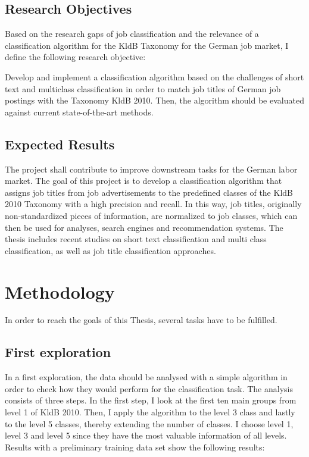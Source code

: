 \documentclass[a4paper]{article}
\begin{document}
\subsection{Research Objectives}
Based on the research gaps of job classification and the relevance of a classification algorithm for the KldB Taxonomy for the German job market, I define the following research objective: 

Develop and implement a classification algorithm based on the challenges of short text and multiclass classification in order to match job titles of German job postings with the Taxonomy KldB 2010. Then, the algorithm should be evaluated against current state-of-the-art methods.

\subsection{Expected Results}
The project shall contribute to improve downstream tasks for the German labor market. The goal of this project is to develop a classification algorithm that assigns job titles from job advertisements to the predefined classes of the KldB 2010 Taxonomy with a high precision and recall. In this way, job titles, originally non-standardized pieces of information, are normalized to job classes, which can then be used for analyses, search engines and recommendation systems. The thesis includes recent studies on short text classification and multi class classification, as well as job title classification approaches. 

\section{Methodology}
In order to reach the goals of this Thesis, several tasks have to be fulfilled. 

\subsection*{First exploration}
In a first exploration, the data should be analysed with a simple algorithm in order to check how they would perform for the classification task. The analysis consists of three steps. In the first step, I look at the first ten main groups from level 1 of KldB 2010. Then, I apply the algorithm to the level 3 class and lastly to the level 5 classes, thereby extending the number of classes. I choose level 1, level 3 and level 5 since they have the most valuable information of all levels. Results with a preliminary training data set show the following results: 
\end{document}
